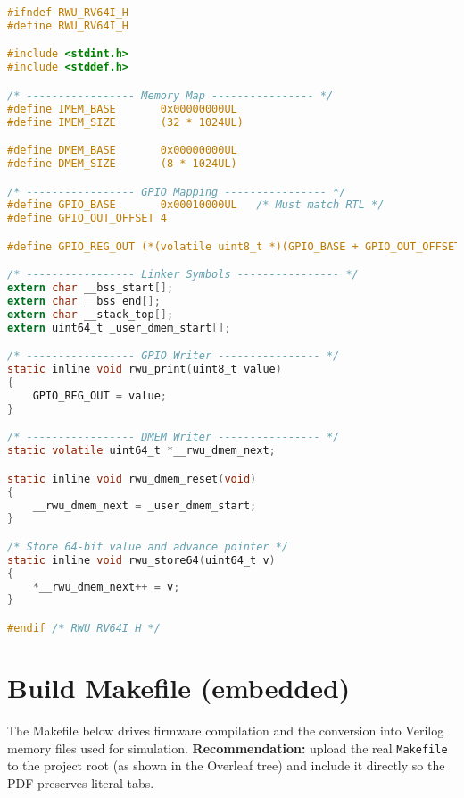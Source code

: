 \begin{lstlisting}[language=C,caption={RWU-RV64I Runtime Header File},label={lst:runtime_header}]
#ifndef RWU_RV64I_H
#define RWU_RV64I_H

#include <stdint.h>
#include <stddef.h>

/* ----------------- Memory Map ---------------- */
#define IMEM_BASE       0x00000000UL
#define IMEM_SIZE       (32 * 1024UL)

#define DMEM_BASE       0x00000000UL
#define DMEM_SIZE       (8 * 1024UL)

/* ----------------- GPIO Mapping ---------------- */
#define GPIO_BASE       0x00010000UL   /* Must match RTL */
#define GPIO_OUT_OFFSET 4

#define GPIO_REG_OUT (*(volatile uint8_t *)(GPIO_BASE + GPIO_OUT_OFFSET))

/* ----------------- Linker Symbols ---------------- */
extern char __bss_start[];
extern char __bss_end[];
extern char __stack_top[];
extern uint64_t _user_dmem_start[];

/* ----------------- GPIO Writer ---------------- */
static inline void rwu_print(uint8_t value)
{
	GPIO_REG_OUT = value;
}

/* ----------------- DMEM Writer ---------------- */
static volatile uint64_t *__rwu_dmem_next;

static inline void rwu_dmem_reset(void)
{
	__rwu_dmem_next = _user_dmem_start;
}

/* Store 64-bit value and advance pointer */
static inline void rwu_store64(uint64_t v)
{
    *__rwu_dmem_next++ = v;
}

#endif /* RWU_RV64I_H */
\end{lstlisting}




\section{Build Makefile (embedded)}
\label{app:makefile_embedded}

The Makefile below drives firmware compilation and the conversion into Verilog memory files used for simulation.  
\textbf{Recommendation:} upload the real \texttt{Makefile} to the project root (as shown in the Overleaf tree) and include it directly so the PDF preserves literal tabs.

\bigskip


